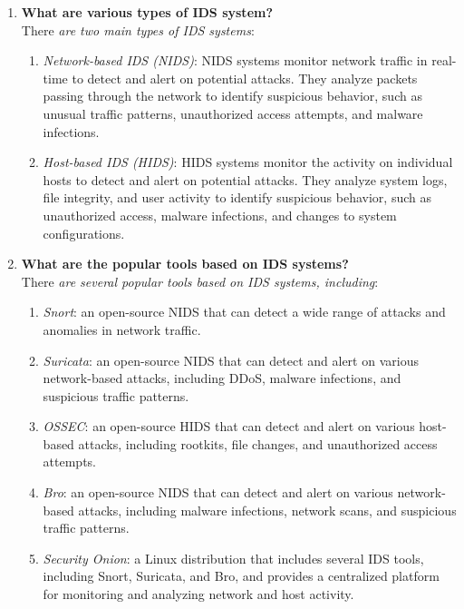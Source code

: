 \documentclass[11pt]{article}
\begin{document}
\begin{enumerate}
    \item \textbf{What are various types of IDS system?}\\

          There \textit{are two main types of IDS systems}:
          \begin{enumerate}
              \item \textit{Network-based IDS (NIDS)}: NIDS systems monitor network traffic in real-time to detect and alert on potential attacks. They analyze packets passing through the network to identify suspicious behavior, such as unusual traffic patterns, unauthorized access attempts, and malware infections.
              \item \textit{Host-based IDS (HIDS)}: HIDS systems monitor the activity on individual hosts to detect and alert on potential attacks. They analyze system logs, file integrity, and user activity to identify suspicious behavior, such as unauthorized access, malware infections, and changes to system configurations.
          \end{enumerate}

    \item \textbf{What are the popular tools based on IDS systems?}\\

          There \textit{are several popular tools based on IDS systems, including}:

          \begin{enumerate}
              \item \textit{Snort}: an open-source NIDS that can detect a wide range of attacks and anomalies in network traffic.
              \item \textit{Suricata}: an open-source NIDS that can detect and alert on various network-based attacks, including DDoS, malware infections, and suspicious traffic patterns.
              \item \textit{OSSEC}: an open-source HIDS that can detect and alert on various host-based attacks, including rootkits, file changes, and unauthorized access attempts.
              \item \textit{Bro}: an open-source NIDS that can detect and alert on various network-based attacks, including malware infections, network scans, and suspicious traffic patterns.
              \item \textit{Security Onion}: a Linux distribution that includes several IDS tools, including Snort, Suricata, and Bro, and provides a centralized platform for monitoring and analyzing network and host activity.
          \end{enumerate}


\end{enumerate}
\end{document}
